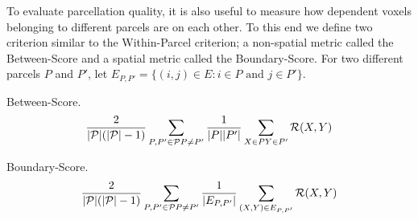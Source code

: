 To evaluate parcellation quality, it is also useful to measure how
dependent voxels belonging to different parcels are on each other. To
this end we define two criterion similar to the Within-Parcel criterion;
a non-spatial metric called the Between-Score and a spatial metric
called the Boundary-Score. For two different parcels $P$ and $P'$, let
$E_{P,P'} = \{ (i,j) \in E : i \in P \text{ and } j \in P' \}$.

\begin{definition} \label{between-score}
Between-Score.
\[ \frac{2}{|\mathcal{P}|(|\mathcal{P}| - 1)}
     \sum_{P, P' \in \mathcal{P} \\ P \neq P'}
   \frac{1}{|P| |P'|} \sum_{X \in P \\ Y \in P'} \mathcal{R}(X,Y)
\]
\end{definition}

\begin{definition} \label{boundary-score}
Boundary-Score.
\[ \frac{2}{|\mathcal{P}|(|\mathcal{P}| - 1)}
     \sum_{P, P' \in \mathcal{P} \\ P \neq P'}
   \frac{1}{|E_{P,P'}|} \sum_{(X,Y) \in E_{P,P'}} \mathcal{R}(X,Y)
\]
\end{definition}
